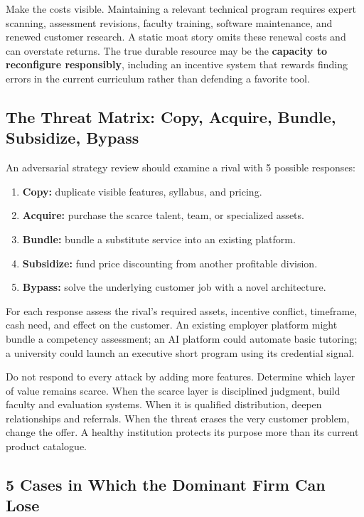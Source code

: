 Make the costs visible. Maintaining a relevant technical program requires expert scanning, assessment revisions, faculty training, software maintenance, and renewed customer research. A static moat story omits these renewal costs and can overstate returns. The true durable resource may be the \textbf{capacity to reconfigure responsibly}, including an incentive system that rewards finding errors in the current curriculum rather than defending a favorite tool.

\subsection{The Threat Matrix: Copy, Acquire, Bundle, Subsidize, Bypass}
\label{sec:threat_matrix_five_responses}

An adversarial strategy review should examine a rival with 5 possible responses:
\begin{enumerate}
    \item \textbf{Copy:} duplicate visible features, syllabus, and pricing.
    \item \textbf{Acquire:} purchase the scarce talent, team, or specialized assets.
    \item \textbf{Bundle:} bundle a substitute service into an existing platform.
    \item \textbf{Subsidize:} fund price discounting from another profitable division.
    \item \textbf{Bypass:} solve the underlying customer job with a novel architecture.
\end{enumerate}

For each response assess the rival's required assets, incentive conflict, timeframe, cash need, and effect on the customer. An existing employer platform might bundle a competency assessment; an AI platform could automate basic tutoring; a university could launch an executive short program using its credential signal.

Do not respond to every attack by adding more features. Determine which layer of value remains scarce. When the scarce layer is disciplined judgment, build faculty and evaluation systems. When it is qualified distribution, deepen relationships and referrals. When the threat erases the very customer problem, change the offer. A healthy institution protects its purpose more than its current product catalogue.

\subsection{5 Cases in Which the Dominant Firm Can Lose}
\label{sec:five_cases_dominant_firm_loses}

